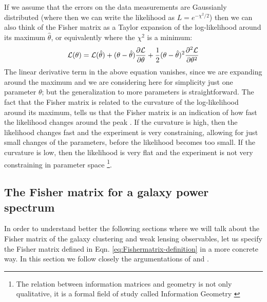If we assume that the errors on the data measurements are Gaussianly distributed (where then we can write the likelihood as 
$L = e^{-\chi^2 / 2}$) then we can also think of the Fisher matrix as a Taylor expansion of the log-likelihood around its maximum
$\hat \theta$, or equivalently where the $\chi^2$ is a minimum:
\begin{equation}
\mathcal{L}(\theta) = \mathcal{L}(\hat \theta) + (\theta - \hat \theta)\frac{\partial{\mathcal{L}}}{\partial{\theta}} + 
\frac{1}{2}(\theta - \hat \theta)^2 \frac{\partial^2{\mathcal{L}}}{\partial{\theta}^2}
\end{equation}
The linear derivative term in the above equation vanishes, since we are expanding around the maximum and we are considering here 
for simplicity just one parameter $\theta$; but the generalization to more parameters is straightforward.
The fact that the Fisher matrix is related to the curvature of the log-likelihood around its maximum, tells us that the Fisher matrix 
is an indication of how fast the likelihood changes around the peak \cite{cite Dodelson...}. 
If the curvature is high, then the likelihood changes
fast and the experiment is very constraining, allowing for just small changes of the parameters, before the likelihood becomes too small.
If the curvature is low, then the likelihood is very flat and the experiment is not very constraining in parameter 
space \footnote{The relation between information matrices and geometry is not only qualitative, it is a 
formal field of study called Information Geometry \cite{cite Springer book}}.

\subsection{The Fisher matrix for a galaxy power spectrum}

In order to understand better the following sections where we will talk about the 
Fisher matrix of the galaxy clustering and weak lensing observables, let us specify the Fisher
matrix defined in Eqn. \ref{eq:Fishermatrix-definition} in a more concrete way.
In this section we follow closely the argumentations of \cite{cite Dodelson} and \cite{cite Amendola}.

